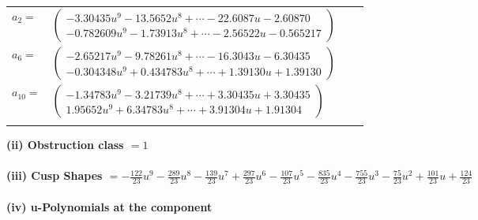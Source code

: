 \documentclass[1p]{elsarticle_modified}
\theoremstyle{definition}
\begin{document}
\begin{tabular}{m{7pt} m{180pt} m{7pt} m{180pt} }
\flushright $a_{2}=$&$\begin{pmatrix}-3.30435 u^{9}-13.5652 u^{8}+\cdots-22.6087 u-2.60870\\-0.782609 u^{9}-1.73913 u^{8}+\cdots-2.56522 u-0.565217\end{pmatrix}$ \\
\flushright $a_{6}=$&$\begin{pmatrix}-2.65217 u^{9}-9.78261 u^{8}+\cdots-16.3043 u-6.30435\\-0.304348 u^{9}+0.434783 u^{8}+\cdots+1.39130 u+1.39130\end{pmatrix}$ \\
\flushright $a_{10}=$&$\begin{pmatrix}-1.34783 u^{9}-3.21739 u^{8}+\cdots+3.30435 u+3.30435\\1.95652 u^{9}+6.34783 u^{8}+\cdots+3.91304 u+1.91304\end{pmatrix}$\\&\end{tabular}
\flushleft \textbf{(ii) Obstruction class $= 1$}\\~\\
\flushleft \textbf{(iii) Cusp Shapes $= -\frac{122}{23} u^9-\frac{289}{23} u^8-\frac{139}{23} u^7+\frac{297}{23} u^6-\frac{107}{23} u^5-\frac{835}{23} u^4-\frac{755}{23} u^3-\frac{75}{23} u^2+\frac{101}{23} u+\frac{124}{23}$}\\~\\
\newpage\renewcommand{\arraystretch}{1}
\flushleft \textbf{(iv) u-Polynomials at the component}\newline \\
\end{document}
